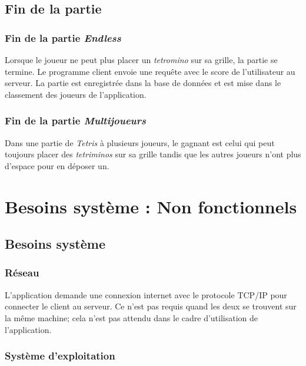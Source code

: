 \documentclass{article}
\begin{document}
\subsection{Fin de la partie}

\subsubsection{Fin de la partie \textit{Endless}}

Lorsque le joueur ne peut plus placer un \textit{tetromino} sur sa grille, la partie se termine. Le programme client envoie une requête avec le score de l'utilisateur au serveur. La partie est enregistrée dans la base de données et est mise dans le classement des joueurs de l'application. 

\subsubsection{Fin de la partie \textit{Multijoueurs}}

Dans une partie de \textit{Tetris} à plusieurs joueurs, le gagnant est celui qui peut toujours placer des \textit{tetriminos} sur sa grille tandis que les autres joueurs n'ont plus d'espace pour en déposer un.

\section{Besoins système : Non fonctionnels}

\subsection{Besoins système}

\subsubsection{Réseau}


L'application demande une connexion internet avec le protocole TCP/IP pour connecter le client au serveur. Ce n'est pas requis quand les deux se trouvent sur la même machine; cela n'est pas attendu dans le cadre d'utilisation de l'application.

\subsubsection{Système d'exploitation}
\end{document}
